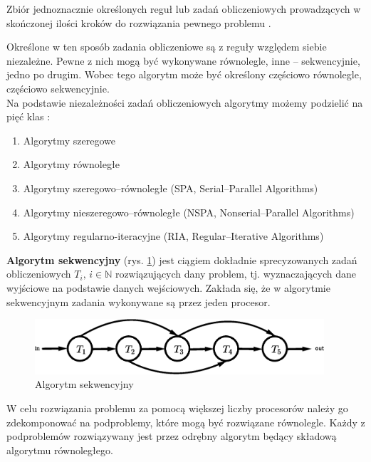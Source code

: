 \begin{definicja}[Algorytm]\label{def:algorytm}
Zbiór jednoznacznie określonych reguł lub zadań obliczeniowych prowadzących w skończonej ilości kroków do rozwiązania pewnego problemu \cite{IEEE}.\\
\end{definicja}

Określone w ten sposób zadania obliczeniowe są z reguły względem siebie niezależne. Pewne z nich mogą być wykonywane równolegle, inne -- sekwencyjnie, jedno po drugim. Wobec tego algorytm może być określony częściowo równolegle, częściowo sekwencyjnie.\\

Na podstawie niezależności zadań obliczeniowych algorytmy możemy podzielić na pięć klas \cite{APC2011}:
\begin{enumerate}
\item Algorytmy szeregowe
\item Algorytmy równoległe
\item Algorytmy szeregowo--równoległe (SPA, Serial--Parallel Algorithms)
\item Algorytmy nieszeregowo--równoległe (NSPA, Nonserial--Parallel Algorithms)
\item Algorytmy regularno-iteracyjne (RIA, Regular--Iterative Algorithms)
\end{enumerate}





\begin{definicja}\label{def:algorytm_sekwencyjny}
\textbf{Algorytm sekwencyjny} (rys.  \ref{fig:sequential}) jest ciągiem dokładnie sprecyzowanych zadań obliczeniowych \(T_i,\, i\in\mathbb{N}\) rozwiązujących dany problem, tj. wyznaczających dane wyjściowe na podstawie danych wejściowych. Zakłada się, że w algorytmie sekwencyjnym zadania wykonywane są przez jeden procesor.
\end{definicja}

\begin{figure}[h]
\centering
\includegraphics[width=29em]{./images/Rys2.eps}
\caption{Algorytm sekwencyjny}
\label{fig:sequential}
\end{figure}

W celu rozwiązania problemu za pomocą większej liczby procesorów należy go zdekomponować na podproblemy, które mogą być rozwiązane równolegle. Każdy z podproblemów rozwiązywany jest przez odrębny algorytm będący składową algorytmu równoległego.


